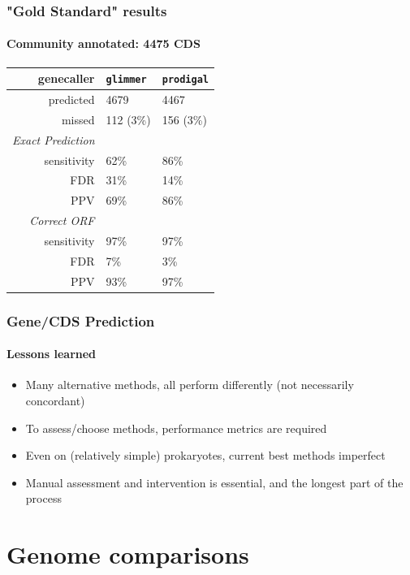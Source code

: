 \documentclass[table]{beamer}
\begin{document}
    \begin{frame}
     \frametitle{"Gold Standard" results}
     \framesubtitle{Community annotated: 4475 CDS}
    \begin{center}
	\begin{tabular}{r|l|l}
	  genecaller & \texttt{glimmer} & \texttt{prodigal}  \\
	  \hline
	  predicted & 4679    & 4467  \\
	  missed & 112 (3\%)   & 156 (3\%)  \\
	  \hline
	  \emph{Exact Prediction} & & \\
  	  sensitivity   & 62\%   & 86\%  \\
  	  FDR   & 31\%   & 14\%  \\  
	  PPV   & 69\% & 86\%  \\  
	  \hline
	  \emph{Correct ORF} & & \\
  	  sensitivity   & 97\%   & 97\% \\
  	  FDR   & 7\%  & 3\% \\  
	  PPV   & 93\% & 97\%  \\  
	\end{tabular}
	\end{center}     
   \end{frame} 

    \begin{frame}
      \frametitle{Gene/CDS Prediction}   
      \framesubtitle{Lessons learned}   
      \begin{itemize}
        \item Many alternative methods, all perform differently (not necessarily concordant)
        \item To assess/choose methods, performance metrics are required
        \item Even on (relatively simple) prokaryotes, current best methods imperfect
        \item Manual assessment and intervention is essential, and the longest part of the process
      \end{itemize}
    \end{frame} 
    
    
\section{Genome comparisons}
\end{document}
